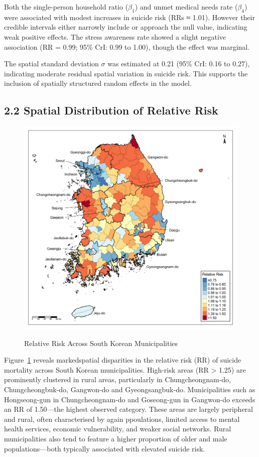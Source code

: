 \documentclass[11pt]{article}
\begin{document}
	Both the single-person household ratio ($\beta_1$) and unmet medical needs rate ($\beta_4$) were associated with modest increases in suicide risk (RRs ≈ 1.01). However their credible intervals either narrowly include or approach the null value, indicating weak positive effects. The stress awareness rate showed a slight negative association (RR = 0.99; 95\% CrI: 0.99 to 1.00), though the effect was marginal.
	
	The spatial standard deviation $\sigma$ was estimated at 0.21 (95\% CrI: 0.16 to 0.27), indicating moderate residual spatial variation in suicide risk. This supports the inclusion of spatially structured random effects in the model.

	\subsection*{2.2 Spatial Distribution of Relative Risk}

	\begin{figure}[H]
		\centering
		\caption{Relative Risk Across South Korean Municipalities}
		\includegraphics[width=1\textwidth]{assets/relative_risk/relative_risk_map_2022_annotated.png}
		\label{fig:relative_risk_map}
	\end{figure}

	Figure~\ref{fig:relative_risk_map} reveals markedspatial disparities in the relative risk (RR) of suicide mortality across South Korean municipalities. High-risk areas (RR > 1.25) are prominently clustered in rural areas, particularly in Chungcheongnam-do, Chungcheongbuk-do, Gangwon-do and Gyeongsangbuk-do. Municipalities such as Hongseong-gun in Chungcheongnam-do and Goseong-gun in Gangwon-do exceeds an RR of 1.50—the highest observed category. These areas are largely peripheral and rural, often characterised by again ppoulations, limited access to mental health services, economic vulnerability, and weaker social networks. Rural municipalities also tend to feature a higher proportion of older and male populations—both typically associated with elevated suicide risk.
	
\end{document}
